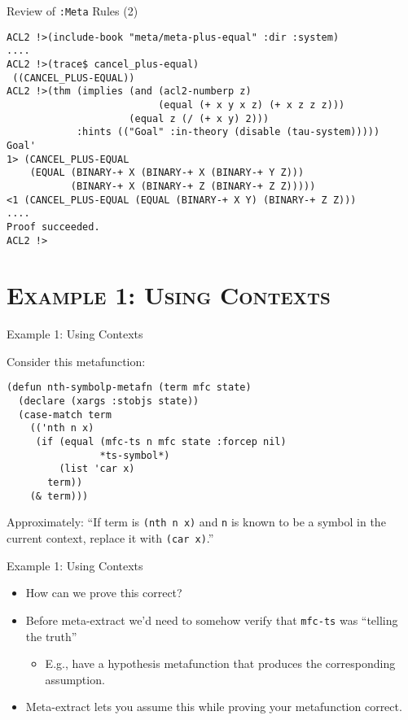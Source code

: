 \begin{frame}[fragile]{Review of {\tt :Meta} Rules (2)}

{\footnotesize
\begin{verbatim}
ACL2 !>(include-book "meta/meta-plus-equal" :dir :system)
....
ACL2 !>(trace$ cancel_plus-equal)
 ((CANCEL_PLUS-EQUAL))
ACL2 !>(thm (implies (and (acl2-numberp z)
                          (equal (+ x y x z) (+ x z z z)))
                     (equal z (/ (+ x y) 2)))
            :hints (("Goal" :in-theory (disable (tau-system)))))
Goal'
1> (CANCEL_PLUS-EQUAL
    (EQUAL (BINARY-+ X (BINARY-+ X (BINARY-+ Y Z)))
           (BINARY-+ X (BINARY-+ Z (BINARY-+ Z Z)))))
<1 (CANCEL_PLUS-EQUAL (EQUAL (BINARY-+ X Y) (BINARY-+ Z Z)))
....
Proof succeeded.
ACL2 !>
\end{verbatim}
}

\end{frame}
\section{\scshape Example 1: Using Contexts}
\begin{frame}[fragile]{Example 1: Using Contexts}

Consider this metafunction:
\begin{verbatim}
(defun nth-symbolp-metafn (term mfc state)
  (declare (xargs :stobjs state))
  (case-match term
    (('nth n x)
     (if (equal (mfc-ts n mfc state :forcep nil)
                *ts-symbol*)
         (list 'car x)
       term))
    (& term)))
\end{verbatim}
Approximately: ``If term is \verb|(nth n x)| and \verb|n| is
known to be a symbol in the current context, replace it with
\verb|(car x)|.''

\end{frame}

\begin{frame}[fragile]{Example 1: Using Contexts}
\begin{itemize}
\item How can we prove this correct?
\item Before meta-extract we'd need to somehow verify that \texttt{mfc-ts} was ``telling the truth''
  \begin{itemize}
  \item E.g., have a hypothesis metafunction that produces the corresponding assumption.
  \end{itemize}
\item Meta-extract lets you assume this while proving your metafunction correct.
\end{itemize}
\end{frame}

